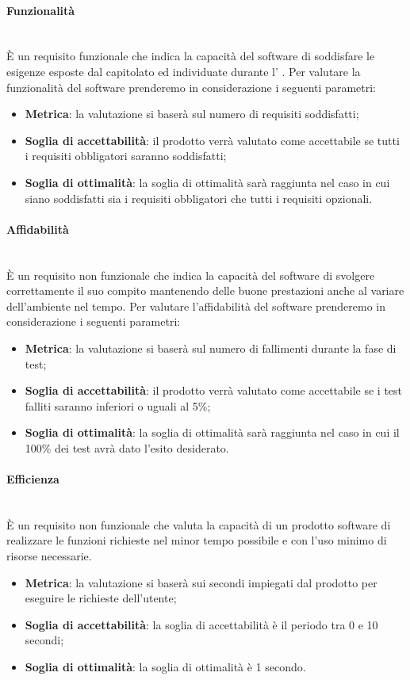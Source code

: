 \paragraph{Funzionalità}
~\\È un requisito funzionale che indica la capacità del software di soddisfare le esigenze esposte dal capitolato ed individuate durante l’ \AdR .
Per valutare la funzionalità del software prenderemo in considerazione i seguenti parametri:
\begin{itemize}
	\item \textbf{Metrica}: la valutazione si baserà sul numero di requisiti soddisfatti;
	\item \textbf{Soglia di accettabilità}: il prodotto verrà valutato come accettabile se tutti i requisiti obbligatori saranno soddisfatti;
	\item \textbf{Soglia di ottimalità}: la soglia di ottimalità sarà raggiunta nel caso in cui siano soddisfatti sia i requisiti obbligatori che tutti i requisiti opzionali.
\end{itemize}

\paragraph{Affidabilità}
~\\È un requisito non funzionale che indica la capacità del software di svolgere correttamente il suo compito mantenendo delle buone prestazioni anche al variare dell’ambiente nel tempo.
Per valutare l'affidabilità del software prenderemo in considerazione i seguenti parametri:
\begin{itemize}
	\item \textbf{Metrica}: la valutazione si baserà sul numero di fallimenti durante la fase di test;
	\item \textbf{Soglia di accettabilità}: il prodotto verrà valutato come accettabile se i test falliti saranno inferiori o uguali al 5\%;
	\item \textbf{Soglia di ottimalità}: la soglia di ottimalità sarà raggiunta nel caso in cui il 100\% dei test avrà dato l'esito desiderato.
\end{itemize}


\paragraph{Efficienza}
~\\È un requisito non funzionale che valuta la capacità di un prodotto software di realizzare le funzioni richieste nel minor tempo possibile e con l’uso minimo di risorse necessarie.
\begin{itemize}
	\item \textbf{Metrica}: la valutazione si baserà sui secondi impiegati dal prodotto per eseguire le richieste dell'utente;
	\item \textbf{Soglia di accettabilità}: la soglia di accettabilità è il periodo tra 0 e 10 secondi;
	\item \textbf{Soglia di ottimalità}: la soglia di ottimalità è 1 secondo.
\end{itemize}

